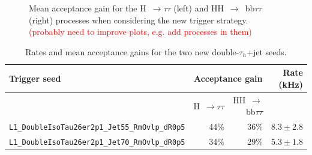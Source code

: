 \documentclass[../main.tex]{subfiles}
\begin{document}
\begin{figure}
\caption{Mean acceptance gain for the H~$\to\tau\tau$ (left) and HH~$\to$~bb$\tau\tau$ (right) processes when considering the new trigger strategy. \textcolor{red}{(probably need to improve plots, e.g. add processes in them)}}
\label{hh:fig:l1_trig_mean_acc}
\end{figure}

\begin{table}[h!]
\begin{small}
\begin{center}
\begin{tabular}{|l|r|r|r|}
\hline
Trigger seed & \multicolumn{2}{c|}{Acceptance gain} &  Rate (kHz) \\
\hline\hline
& H~$\to\tau\tau$ & HH~$\to$~bb$\tau\tau$ &  \\\hline
\texttt{L1\_DoubleIsoTau26er2p1\_Jet55\_RmOvlp\_dR0p5} & 44$\%$ & 36$\%$& $8.3 \pm 2.8$ \\
\texttt{L1\_DoubleIsoTau26er2p1\_Jet70\_RmOvlp\_dR0p5} & 34$\%$ & 29$\%$ & $5.3 \pm 1.8$ \\\hline
\end{tabular}
\end{center}
\end{small}

\caption{Rates and mean acceptance gains for the two new double-$\tau_h$+jet seeds.}
\label{hh:tab:l1trig:allseeds}
\end{table}

\end{document}
